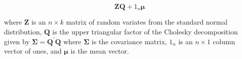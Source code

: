 \begin{equation}
  \mathbf{Z} \mathbf{Q} + 1_n \boldsymbol{\mu}
    \label{eq:rmvn-chol}
\end{equation}

\noindent where
$\mathbf{Z}$ is an $n \times k$ matrix of random variates
from the standard normal distribution,
$\mathbf{Q}$ is the upper triangular factor
of the Cholesky decomposition
given by
$\boldsymbol{\Sigma} = \mathbf{Q}^{\prime} \mathbf{Q}$
where $\boldsymbol{\Sigma}$ is the covariance matrix,
$1_n$ is an $n \times 1$ column vector of ones,
and $\boldsymbol{\mu}$ is the mean vector.
